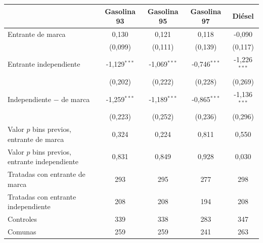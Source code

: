 \begin{tabular}{lcccc}
\toprule
 & Gasolina 93 & Gasolina 95 & Gasolina 97 & Diésel \\
\midrule
Entrante de marca & 0{,}130 & 0{,}121 & 0{,}118 & -0{,}090 \\
 & (0{,}099) & (0{,}111) & (0{,}139) & (0{,}117) \\
Entrante independiente & -1{,}129$^{***}$ & -1{,}069$^{***}$ & -0{,}746$^{***}$ & -1{,}226$^{***}$ \\
 & (0{,}202) & (0{,}222) & (0{,}228) & (0{,}269) \\
Independiente $-$ de marca & -1{,}259$^{***}$ & -1{,}189$^{***}$ & -0{,}865$^{***}$ & -1{,}136$^{***}$ \\
 & (0{,}223) & (0{,}252) & (0{,}236) & (0{,}296) \\
\addlinespace
Valor $p$ bins previos, entrante de marca & 0{,}324 & 0{,}224 & 0{,}811 & 0{,}550 \\
Valor $p$ bins previos, entrante independiente & 0{,}831 & 0{,}849 & 0{,}928 & 0{,}030 \\
\midrule
Tratadas con entrante de marca & 293 & 295 & 277 & 298 \\
Tratadas con entrante independiente & 208 & 208 & 194 & 208 \\
Controles & 339 & 338 & 283 & 347 \\
Comunas & 259 & 259 & 241 & 263 \\
\bottomrule
\end{tabular}
